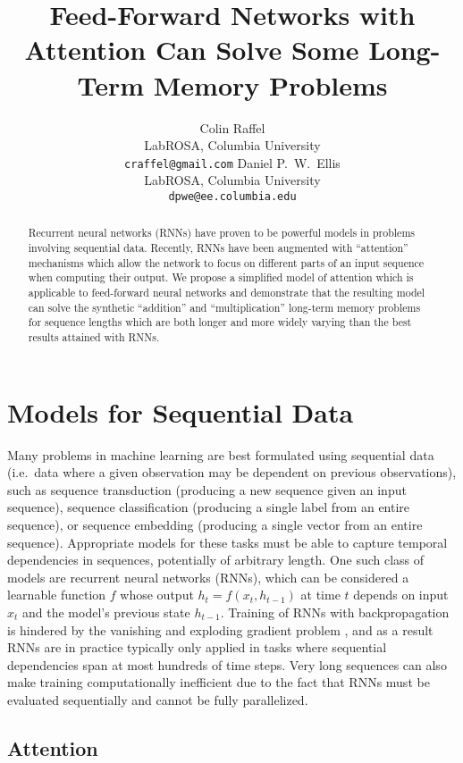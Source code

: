 \documentclass{article} %
\title{Feed-Forward Networks with Attention Can Solve Some Long-Term Memory Problems}
\author{Colin Raffel\\
LabROSA, Columbia University\\
\texttt{craffel@gmail.com}
\And
Daniel P.~W.~Ellis\\
LabROSA, Columbia University\\
\texttt{dpwe@ee.columbia.edu}
}
\begin{document}
\maketitle

\begin{abstract}
Recurrent neural networks (RNNs) have proven to be powerful models in problems involving sequential data.
Recently, RNNs have been augmented with ``attention'' mechanisms which allow the network to focus on different parts of an input sequence when computing their output.
We propose a simplified model of attention which is applicable to feed-forward neural networks and demonstrate that the resulting model can solve the synthetic ``addition'' and ``multiplication'' long-term memory problems for sequence lengths which are both longer and more widely varying than the best results attained with RNNs.
\end{abstract}

\section{Models for Sequential Data}

Many problems in machine learning are best formulated using sequential data (i.e.\ data where a given observation may be dependent on previous observations), such as sequence transduction (producing a new sequence given an input sequence), sequence classification (producing a single label from an entire sequence), or sequence embedding (producing a single vector from an entire sequence).
Appropriate models for these tasks must be able to capture temporal dependencies in sequences, potentially of arbitrary length.
One such class of models are recurrent neural networks (RNNs), which can be considered a learnable function $f$ whose output $h_t = f(x_t, h_{t - 1})$ at time $t$ depends on input $x_t$ and the model's previous state $h_{t - 1}$.
Training of RNNs with backpropagation is hindered by the vanishing and exploding gradient problem \cite{pascanu2012difficulty,hochreiter1997long,bengio1994learning}, and as a result RNNs are in practice typically only applied in tasks where sequential dependencies span at most hundreds of time steps.
Very long sequences can also make training computationally inefficient due to the fact that RNNs must be evaluated sequentially and cannot be fully parallelized.

\subsection{Attention}
\end{document}
